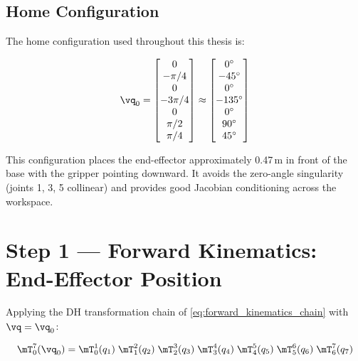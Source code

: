 \subsection{Home Configuration}

The home configuration used throughout this thesis is:

\begin{equation}
\label{eq:q0}
\vq_0 =
\begin{bmatrix}
0 \\ -\pi/4 \\ 0 \\ -3\pi/4 \\ 0 \\ \pi/2 \\ \pi/4
\end{bmatrix}
\approx
\begin{bmatrix}
0^\circ \\ -45^\circ \\ 0^\circ \\ -135^\circ \\ 0^\circ \\ 90^\circ \\ 45^\circ
\end{bmatrix}
\end{equation}

This configuration places the end-effector approximately 0.47\,m in front of
the base with the gripper pointing downward.
It avoids the zero-angle singularity (joints 1, 3, 5 collinear) and provides
good Jacobian conditioning across the workspace.

\section{Step 1 --- Forward Kinematics: End-Effector Position}
\label{app:panda_fk}

Applying the DH transformation chain of \cref{eq:forward_kinematics_chain} with $\vq = \vq_0$:

\begin{equation}
\mT_0^7(\vq_0) =
\mT_0^1(q_1)\;\mT_1^2(q_2)\;\mT_2^3(q_3)\;\mT_3^4(q_4)\;
\mT_4^5(q_5)\;\mT_5^6(q_6)\;\mT_6^7(q_7)
\end{equation}

